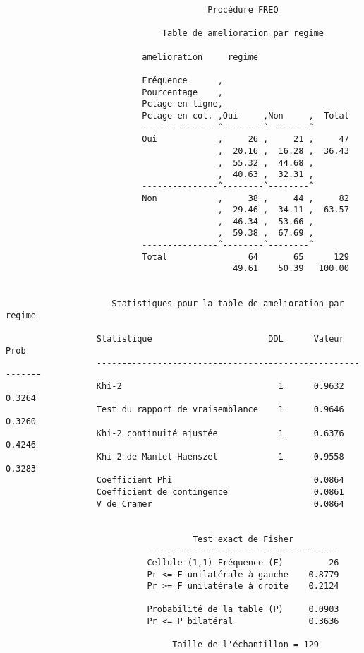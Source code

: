 \begin{verbatim}
                                        Procédure FREQ

                               Table de amelioration par regime

                           amelioration     regime

                           Fréquence      ‚
                           Pourcentage    ‚
                           Pctage en ligne‚
                           Pctage en col. ‚Oui     ‚Non     ‚  Total
                           ---------------ˆ--------ˆ--------ˆ
                           Oui            ‚     26 ‚     21 ‚     47
                                          ‚  20.16 ‚  16.28 ‚  36.43
                                          ‚  55.32 ‚  44.68 ‚
                                          ‚  40.63 ‚  32.31 ‚
                           ---------------ˆ--------ˆ--------ˆ
                           Non            ‚     38 ‚     44 ‚     82
                                          ‚  29.46 ‚  34.11 ‚  63.57
                                          ‚  46.34 ‚  53.66 ‚
                                          ‚  59.38 ‚  67.69 ‚
                           ---------------ˆ--------ˆ--------ˆ
                           Total                64       65      129
                                             49.61    50.39   100.00


                     Statistiques pour la table de amelioration par regime

                  Statistique                       DDL      Valeur      Prob
                  -----------------------------------------------------------
                  Khi-2                               1      0.9632    0.3264
                  Test du rapport de vraisemblance    1      0.9646    0.3260
                  Khi-2 continuité ajustée            1      0.6376    0.4246
                  Khi-2 de Mantel-Haenszel            1      0.9558    0.3283
                  Coefficient Phi                            0.0864
                  Coefficient de contingence                 0.0861
                  V de Cramer                                0.0864


                                     Test exact de Fisher
                            --------------------------------------
                            Cellule (1,1) Fréquence (F)         26
                            Pr <= F unilatérale à gauche    0.8779
                            Pr >= F unilatérale à droite    0.2124

                            Probabilité de la table (P)     0.0903
                            Pr <= P bilatéral               0.3636

                                 Taille de l'échantillon = 129
\end{verbatim}

